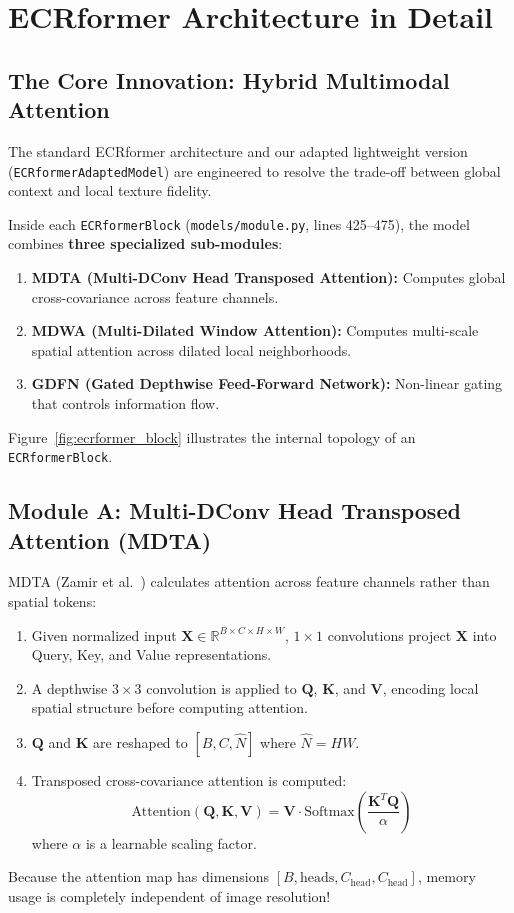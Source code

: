 \chapter{ECRformer Architecture in Detail}
\label{chap:ch11}

\section{The Core Innovation: Hybrid Multimodal Attention}
The standard ECRformer architecture and our adapted lightweight version (\texttt{ECRformerAdaptedModel}) are engineered to resolve the trade-off between global context and local texture fidelity.

Inside each \texttt{ECRformerBlock} (\texttt{models/module.py}, lines 425--475), the model combines \textbf{three specialized sub-modules}:
\begin{enumerate}
    \item \textbf{MDTA (Multi-DConv Head Transposed Attention):} Computes global cross-covariance across feature channels.
    \item \textbf{MDWA (Multi-Dilated Window Attention):} Computes multi-scale spatial attention across dilated local neighborhoods.
    \item \textbf{GDFN (Gated Depthwise Feed-Forward Network):} Non-linear gating that controls information flow.
\end{enumerate}

Figure~\ref{fig:ecrformer_block} illustrates the internal topology of an \texttt{ECRformerBlock}.



\section{Module A: Multi-DConv Head Transposed Attention (MDTA)}
MDTA (Zamir et al.~\cite{zamir2022restormer}) calculates attention across feature channels rather than spatial tokens:
\begin{enumerate}
    \item Given normalized input $\mathbf{X} \in \mathbb{R}^{B \times C \times H \times W}$, $1 \times 1$ convolutions project $\mathbf{X}$ into Query, Key, and Value representations.
    \item A depthwise $3 \times 3$ convolution is applied to $\mathbf{Q}$, $\mathbf{K}$, and $\mathbf{V}$, encoding local spatial structure before computing attention.
    \item $\mathbf{Q}$ and $\mathbf{K}$ are reshaped to $[B, C, \hat{N}]$ where $\hat{N} = HW$.
    \item Transposed cross-covariance attention is computed:
    \begin{equation}
    \text{Attention}(\mathbf{Q}, \mathbf{K}, \mathbf{V}) = \mathbf{V} \cdot \text{Softmax}\left(\frac{\mathbf{K}^T \mathbf{Q}}{\alpha}\right)
    \end{equation}
    where $\alpha$ is a learnable scaling factor.
\end{enumerate}
Because the attention map has dimensions $[B, \text{heads}, C_{\text{head}}, C_{\text{head}}]$, memory usage is completely independent of image resolution!

